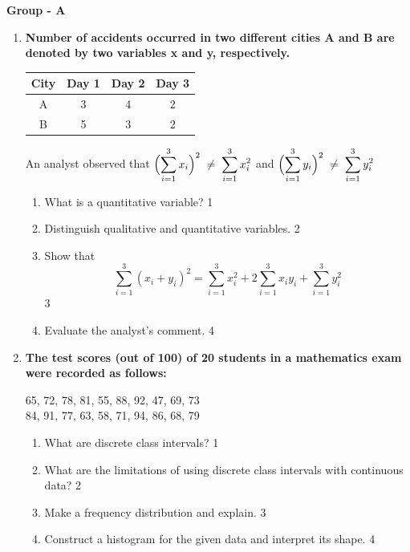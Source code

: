 \documentclass[12pt]{article}
\begin{document}
\begin{center}
\textbf{Group  - A}
\end{center}
\begin{enumerate}

\item

  \textbf{Number of accidents occurred in two different cities A and B are denoted by two variables x and y, respectively.} 
  
  \begin{table}[h]
  \centering
\begin{tabular}{c|c|c|c}
City & Day 1 & Day 2 & Day 3 \\ \hline
A    & 3     & 4     & 2     \\
B    & 5     & 3     & 2    
\end{tabular}
\end{table}
  
  An analyst observed that $\displaystyle \Bigl(\sum_{i=1}^{3} x_i\Bigr)^2 \;\neq\; \sum_{i=1}^{3} x_i^2$ and  $\displaystyle \Bigl(\sum_{i=1}^{3} y_i\Bigr)^2 \;\neq\; \sum_{i=1}^{3} y_i^2$
  
  \begin{enumerate}
   \item What is a quantitative variable? \hfill 1
 \item Distinguish qualitative and quantitative variables. \hfill 2
    \item  Show that 
	\[
\sum_{i=1}^{3} (x_i + y_i)^2 = \sum_{i=1}^{3} x_i^2 + 2\sum_{i=1}^{3} x_i y_i + \sum_{i=1}^{3} y_i^2
\] \hfill 3
    \item
	Evaluate the analyst's comment. \hfill 4
  \end{enumerate}
  
    \item
\textbf{The test scores (out of 100) of 20 students in a mathematics exam were recorded as follows:}
\begin{center}
65, 72, 78, 81, 55, 88, 92, 47, 69, 73 \\
84, 91, 77, 63, 58, 71, 94, 86, 68, 79 
\end{center}

\begin{enumerate}
    \item
    What are discrete class intervals? \hfill 1
    \item
    What are the limitations of using discrete class intervals with continuous data? \hfill 2
    \item
    Make a frequency distribution and explain. \hfill 3
    \item  
    Construct a histogram for the given data and interpret its shape. \hfill 4
\end{enumerate}


\end{enumerate}
\end{document}
